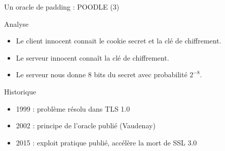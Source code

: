 \documentclass{mpg-ep-slides}
\begin{document}
\begin{frame}{Un oracle de padding : POODLE (3)}
  \begin{block}{Analyse}
    \begin{itemize}
      \item Le client innocent connait le cookie secret et la clé de
        chiffrement.
      \item Le serveur innocent connaît la clé de chiffrement.
      \item Le serveur nous donne 8 bits du secret avec probabilité $2^{-8}$.
    \end{itemize}
  \end{block}

  \begin{block}{Historique}
    \begin{itemize}
      \item 1999 : problème résolu dans TLS 1.0
      \item 2002 : principe de l'oracle publié (Vaudenay)
      \item 2015 : exploit pratique publié, accélère la mort de SSL 3.0
    \end{itemize}
  \end{block}

\end{frame}
\end{document}
